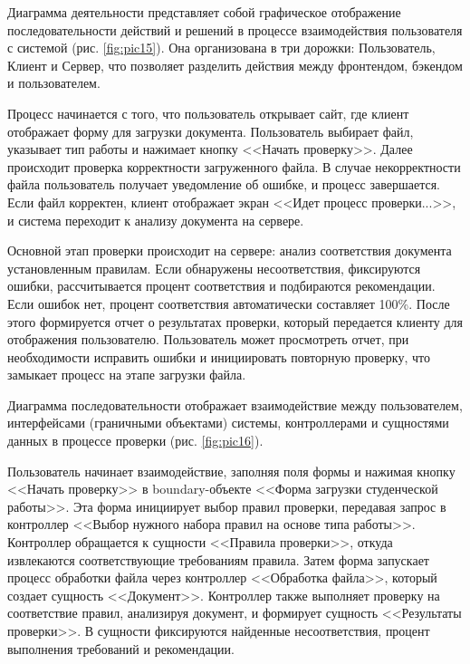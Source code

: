 \documentclass{report}
\begin{document}
Диаграмма деятельности представляет собой графическое отображение последовательности действий и решений в процессе взаимодействия пользователя с системой (рис.  \ref{fig:pic15}). Она организована в три дорожки: Пользователь, Клиент и Сервер, что позволяет разделить действия между фронтендом, бэкендом и пользователем. 

Процесс начинается с того, что пользователь открывает сайт, где клиент отображает форму для загрузки документа. Пользователь выбирает файл, указывает тип работы и нажимает кнопку <<Начать проверку>>. Далее происходит проверка корректности загруженного файла. В случае некорректности файла пользователь получает уведомление об ошибке, и процесс завершается. Если файл корректен, клиент отображает экран <<Идет процесс проверки...>>, и система переходит к анализу документа на сервере.


   Основной этап проверки происходит на сервере: анализ соответствия документа установленным правилам. Если обнаружены несоответствия, фиксируются ошибки, рассчитывается процент соответствия и подбираются рекомендации. Если ошибок нет, процент соответствия автоматически составляет 100\%. После этого формируется отчет о результатах проверки, который передается клиенту для отображения пользователю. Пользователь может просмотреть отчет, при необходимости исправить ошибки и инициировать повторную проверку, что замыкает процесс на этапе загрузки файла.

Диаграмма последовательности отображает взаимодействие между пользователем, интерфейсами (граничными объектами) системы, контроллерами и сущностями данных в процессе проверки (рис.  \ref{fig:pic16}). 


Пользователь начинает взаимодействие, заполняя поля формы и нажимая кнопку <<Начать проверку>> в boundary-объекте <<Форма загрузки студенческой работы>>. Эта форма инициирует выбор правил проверки, передавая запрос в контроллер <<Выбор нужного набора правил на основе типа работы>>. Контроллер обращается к сущности <<Правила проверки>>, откуда извлекаются соответствующие требованиям правила. Затем форма запускает процесс обработки файла через контроллер <<Обработка файла>>, который создает сущность <<Документ>>. Контроллер также выполняет проверку на соответствие правил, анализируя документ, и формирует сущность <<Результаты проверки>>. В сущности фиксируются найденные несоответствия, процент выполнения требований и рекомендации. 
\end{document}
